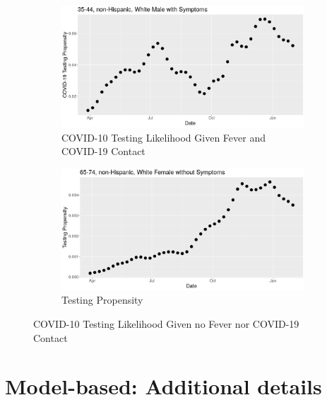 \documentclass[11pt]{amsart}
\numberwithin{equation}{section}
\theoremstyle{plain}
\begin{document}
\begin{figure}[!th]
\centering
\begin{subfigure}{.5\textwidth}
 \centering
 \includegraphics[width=.9\linewidth]{../figs/tvprop_alt_fig1.png}
 \caption{COVID-10 Testing Likelihood Given Fever and COVID-19 Contact}
 \label{fig:testinglik1}
\end{subfigure}%
\begin{subfigure}{.5\textwidth}
 \centering
\includegraphics[width=.9\linewidth]{../figs/tvprop_alt_fig2.png}
 \caption{Testing Propensity}
 \label{fig:testinglik2}
\end{subfigure}
\caption{COVID-10 Testing Likelihood Given no Fever nor COVID-19 Contact}
\label{fig:testinglik}
\end{figure}

\section{Model-based: Additional details}
\label{app:modelbased}
\end{document}
